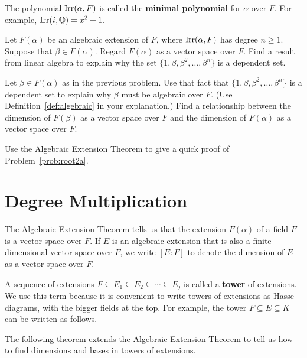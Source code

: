 The polynomial $\operatorname{Irr}(\alpha, F)$ is called the \textbf{minimal polynomial} for $\alpha$ over $F$. For example, $\operatorname{Irr}(i, \mathbb{Q}) = x^2 + 1$.

\begin{problem}\label{prob:finalg1}
Let $F(\alpha)$ be an algebraic extension of $F$, where $\operatorname{Irr}(\alpha, F)$ has degree $n\geq 1$.  Suppose that $\beta \in F(\alpha)$.  Regard $F(\alpha)$ as a vector space over $F$. Find a result from linear algebra to explain why the set $\{1, \beta, \beta^2, \ldots, \beta^n\}$ is a dependent set.
\end{problem}

\begin{problem}\label{prob:finalg2}
Let $\beta \in F(\alpha)$ as in the previous problem.
Use that fact that $\{1, \beta, \beta^2, \ldots, \beta^n\}$ is a dependent set to explain why $\beta$ must be algebraic over $F$. (Use Definition~\ref{def:algebraic} in your explanation.) Find a relationship between the dimension of $F(\beta)$ as a vector space over $F$ and the dimension of $F(\alpha)$ as a vector space over $F$.
\end{problem}

\begin{problem}
    Use the Algebraic Extension Theorem to give a quick proof of Problem~\ref{prob:root2a}.
\end{problem}

\section{Degree Multiplication}

The Algebraic Extension Theorem tells us that the extension $F(\alpha)$ of a field $F$ is a vector space over $F$. If $E$ is an algebraic extension that is also a finite-dimensional vector space over $F$, we write $[E : F]$ to denote the dimension of $E$ as a vector space over $F$.

A sequence of extensions $F \subseteq E_1 \subseteq E_2 \subseteq \cdots \subseteq E_j$ is called a \textbf{tower} of extensions. We use this term because it is convenient to write towers of extensions as Hasse diagrams, with the bigger fields at the top. For example, the tower $F\subseteq E \subseteq K$ can be written as follows.
\begin{annotation}
\end{annotation}
\begin{center}\small
{}
\end{center}
The following theorem extends the Algebraic Extension Theorem to tell us how to find dimensions and bases in towers of extensions.

